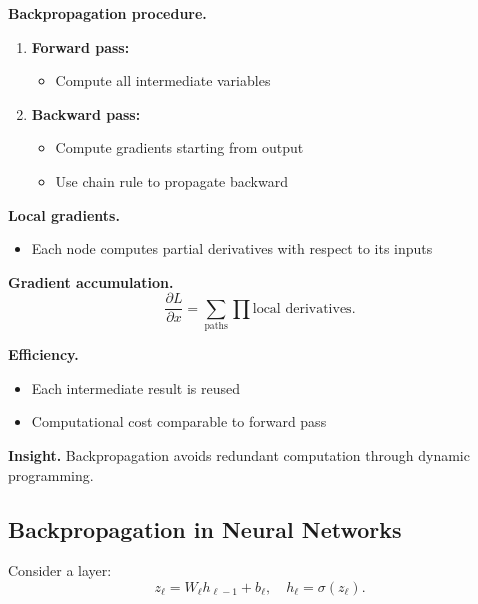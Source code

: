 \medskip

\noindent
\textbf{Backpropagation procedure.}

\begin{enumerate}
    \item \textbf{Forward pass:}
    \begin{itemize}
        \item Compute all intermediate variables
    \end{itemize}

    \item \textbf{Backward pass:}
    \begin{itemize}
        \item Compute gradients starting from output
        \item Use chain rule to propagate backward
    \end{itemize}
\end{enumerate}

\medskip

\noindent
\textbf{Local gradients.}
\begin{itemize}
    \item Each node computes partial derivatives with respect to its inputs
\end{itemize}

\medskip

\noindent
\textbf{Gradient accumulation.}
\[
\frac{\partial L}{\partial x} = \sum_{\text{paths}} \prod \text{local derivatives}.
\]

\medskip

\noindent
\textbf{Efficiency.}
\begin{itemize}
    \item Each intermediate result is reused
    \item Computational cost comparable to forward pass
\end{itemize}

\medskip

\noindent
\textbf{Insight.}  
Backpropagation avoids redundant computation through dynamic programming.

\subsection{Backpropagation in Neural Networks}

Consider a layer:
\[
z_\ell = W_\ell h_{\ell-1} + b_\ell, \quad h_\ell = \sigma(z_\ell).
\]

\medskip

